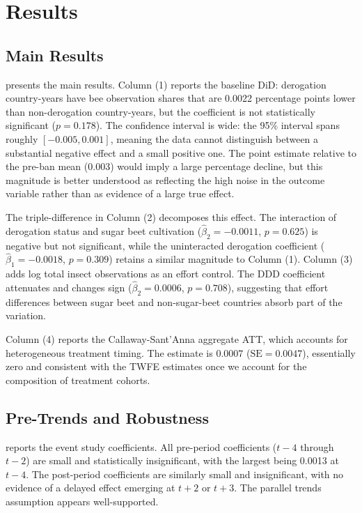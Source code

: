\documentclass[12pt]{article}
\begin{document}
\section{Results}
\label{sec:results}

\subsection{Main Results}



 presents the main results. Column (1) reports the baseline DiD: derogation country-years have bee observation shares that are 0.0022 percentage points lower than non-derogation country-years, but the coefficient is not statistically significant ($p = 0.178$). The confidence interval is wide: the 95\% interval spans roughly $[-0.005, 0.001]$, meaning the data cannot distinguish between a substantial negative effect and a small positive one. The point estimate relative to the pre-ban mean (0.003) would imply a large percentage decline, but this magnitude is better understood as reflecting the high noise in the outcome variable rather than as evidence of a large true effect.

The triple-difference in Column (2) decomposes this effect. The interaction of derogation status and sugar beet cultivation ($\hat{\beta}_2 = -0.0011$, $p = 0.625$) is negative but not significant, while the uninteracted derogation coefficient ($\hat{\beta}_1 = -0.0018$, $p = 0.309$) retains a similar magnitude to Column (1). Column (3) adds log total insect observations as an effort control. The DDD coefficient attenuates and changes sign ($\hat{\beta}_2 = 0.0006$, $p = 0.708$), suggesting that effort differences between sugar beet and non-sugar-beet countries absorb part of the variation.

Column (4) reports the Callaway-Sant'Anna aggregate ATT, which accounts for heterogeneous treatment timing. The estimate is $0.0007$ ($\text{SE} = 0.0047$), essentially zero and consistent with the TWFE estimates once we account for the composition of treatment cohorts.

\subsection{Pre-Trends and Robustness}



 reports the event study coefficients. All pre-period coefficients ($t-4$ through $t-2$) are small and statistically insignificant, with the largest being 0.0013 at $t-4$. The post-period coefficients are similarly small and insignificant, with no evidence of a delayed effect emerging at $t+2$ or $t+3$. The parallel trends assumption appears well-supported.
\end{document}
